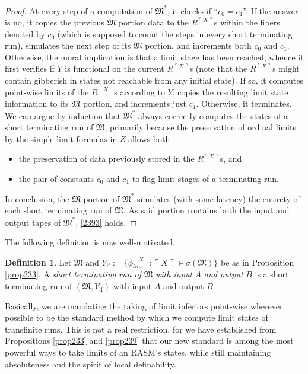 \documentclass[12pt, twoside]{memoir}
\numberwithin{equation}{section}
\theoremstyle{definition}
\newtheorem{defi}[thm]{Definition}
\theoremstyle{remark}
\theoremstyle{definition}
\theoremstyle{definition}
\theoremstyle{definition}
\theoremstyle{remark}
\begin{document}
\begin{proof}
At every step of a computation of $\mathfrak{M}^*$, it checks if ``$c_0 = c_1$''. If the answer is no, it copies the previous $\mathfrak{M}$ portion data to the $R^{\ulcorner X \urcorner}$s within the fibers denoted by $c_0$ (which is supposed to count the steps in every short terminating run), simulates the next step of its $\mathfrak{M}$ portion, and increments both $c_0$ and $c_1$. Otherwise, the moral implication is that a limit stage has been reached, whence it first verifies if $Y$ is functional on the current $R^{\ulcorner X \urcorner}$s (note that the $R^{\ulcorner X \urcorner}$s might contain gibberish in states not reachable from any initial state). If so, it computes point-wise limits of the $R^{\ulcorner X \urcorner}$s according to $Y$, copies the resulting limit state information to its $\mathfrak{M}$ portion, and increments just $c_1$. Otherwise, it terminates. We can argue by induction that $\mathfrak{M}^*$ always correctly computes the states of a short terminating run of $\mathfrak{M}$, primarily because the preservation of ordinal limits by the simple limit formulas in $Z$ allows both
\begin{itemize}
    \item the preservation of data previously stored in the $R^{\ulcorner X \urcorner}$s, and
    \item the pair of constants $c_0$ and $c_1$ to flag limit stages of a terminating run.
\end{itemize} 

In conclusion, the $\mathfrak{M}$ portion of $\mathfrak{M}^*$ simulates (with some latency) the entirety of each short terminating run of $\mathfrak{M}$. As said portion contains both the input and output tapes of $\mathfrak{M}^*$, \ref{2393} holds.
\end{proof}

The following definition is now well-motivated.

\begin{defi}
Let $\mathfrak{M}$ and $Y_{\mathrm{lf}} := \{\phi_{lim}^{\ulcorner X \urcorner} : \ulcorner X \urcorner \in \sigma(\mathfrak{M})\}$ be as in Proposition \ref{prop233}. A \emph{short terminating run of} $\mathfrak{M}$ \emph{with input} $A$ \emph{and output} $B$ is a short terminating run of $(\mathfrak{M}, Y_{\mathrm{lf}})$ with input $A$ and output $B$.
\end{defi}

Basically, we are mandating the taking of limit inferiors point-wise wherever possible to be the standard method by which we compute limit states of transfinite runs. This is not a real restriction, for we have established from Propositions \ref{prop233} and \ref{prop239} that our new standard is among the most powerful ways to take limits of an RASM's states, while still maintaining absoluteness and the spirit of local definability.
\end{document}
